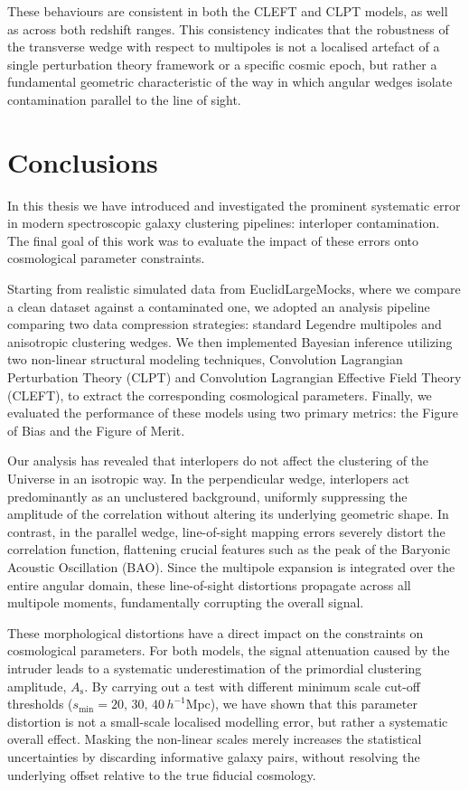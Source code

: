 \documentclass[12pt,a4paper,oneside]{report}
\begin{document}
These behaviours are consistent in both the CLEFT and CLPT models, as well as across both redshift ranges. This consistency indicates that the robustness of the transverse wedge with respect to multipoles is not a localised artefact of a single perturbation theory framework or a specific cosmic epoch, but rather a fundamental geometric characteristic of the way in which angular wedges isolate contamination parallel to the line of sight.

\chapter{Conclusions}\label{chap:Conclusions}
In this thesis we have introduced and investigated the prominent systematic error in modern spectroscopic galaxy clustering pipelines: interloper contamination. The final goal of this work was to evaluate the impact of these errors onto cosmological parameter constraints.

Starting from realistic simulated data from EuclidLargeMocks, where we compare a clean dataset against a contaminated one, we adopted an analysis pipeline comparing two data compression strategies: standard Legendre multipoles and anisotropic clustering wedges. We then implemented Bayesian inference utilizing two non-linear structural modeling techniques, Convolution Lagrangian Perturbation Theory (CLPT) and Convolution Lagrangian Effective Field Theory (CLEFT), to extract the corresponding cosmological parameters. Finally, we evaluated the performance of these models using two primary metrics: the Figure of Bias and the Figure of Merit.

Our analysis has revealed that interlopers do not affect the clustering of the Universe in an isotropic way. In the perpendicular wedge, interlopers act predominantly as an unclustered background, uniformly suppressing the amplitude of the correlation without altering its underlying geometric shape. In contrast, in the parallel wedge, line-of-sight mapping errors severely distort the correlation function, flattening crucial features such as the peak of the Baryonic Acoustic Oscillation (BAO). Since the multipole expansion is integrated over the entire angular domain, these line-of-sight distortions propagate across all multipole moments, fundamentally corrupting the overall signal.

These morphological distortions have a direct impact on the constraints on cosmological parameters. For both models, the signal attenuation caused by the intruder leads to a systematic underestimation of the primordial clustering amplitude, $A_\mathrm{s}$. By carrying out a test with different minimum scale cut-off thresholds ($s_{\mathrm{min}} = 20, \,30,\, 40 \, h^{-1}\mathrm{Mpc}$), we have shown that this parameter distortion is not a small-scale localised modelling error, but rather a systematic overall effect. Masking the non-linear scales merely increases the statistical uncertainties by discarding informative galaxy pairs, without resolving the underlying offset relative to the true fiducial cosmology.
\end{document}
